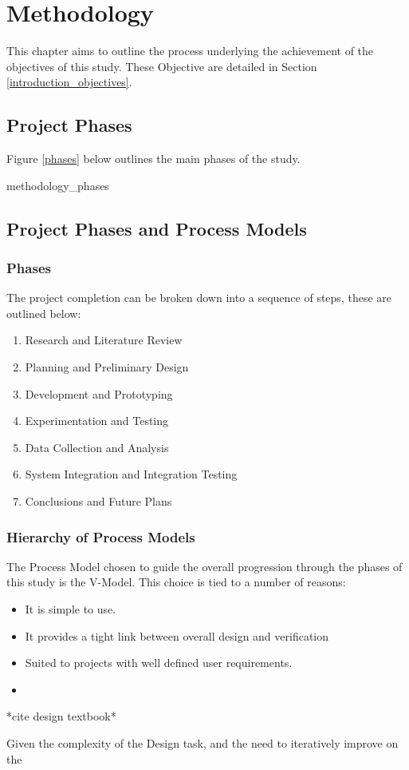 \chapter{Methodology}\label{methodology}
This chapter aims to outline the process underlying the achievement of the
objectives of this study. These Objective are detailed in
Section \ref{introduction_objectives}.

\section{Project Phases}
Figure \ref{phases} below outlines the main phases of the study.

{methodology_phases}

\section{Project Phases and Process Models}

\subsection{Phases}
The project completion can be broken down into a sequence of steps, these are
outlined below:
\begin{enumerate}
    \item Research and Literature Review
    \item Planning and Preliminary Design
    \item Development and Prototyping 
    \item Experimentation and Testing
    \item Data Collection and Analysis
    \item System Integration and Integration Testing
    \item Conclusions and Future Plans
\end{enumerate}

\subsection{Hierarchy of Process Models}
The Process Model chosen to guide the overall progression through the phases of
this study is the V-Model. This choice is tied to a number of reasons: 
\begin{itemize}
    \item It is simple to use.
    \item It provides a tight link between overall design and verification 
    \item Suited to projects with well defined user requirements.
    \item
\end{itemize}

*cite design textbook*

Given the complexity of the Design task, and the need to iteratively improve on the














